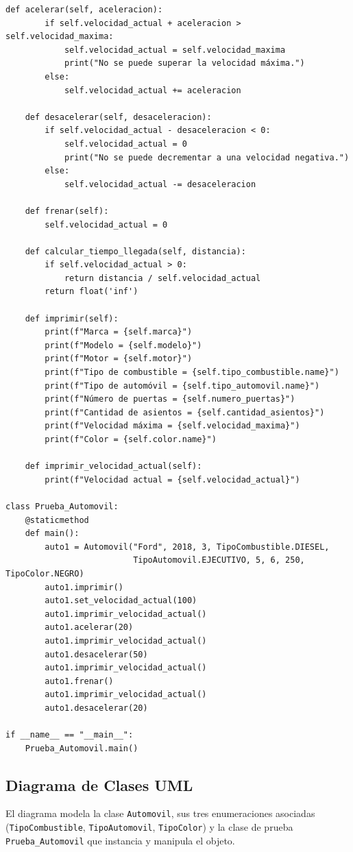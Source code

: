 \documentclass[11pt,a4paper]{article}
\begin{document}
\begin{lstlisting}[caption={Implementación de la clase Automóvil y pruebas (\texttt{Actividad2\_Ejercicio2\_3\_Automovil.py})}]
    def acelerar(self, aceleracion):
        if self.velocidad_actual + aceleracion > self.velocidad_maxima:
            self.velocidad_actual = self.velocidad_maxima
            print("No se puede superar la velocidad máxima.")
        else:
            self.velocidad_actual += aceleracion

    def desacelerar(self, desaceleracion):
        if self.velocidad_actual - desaceleracion < 0:
            self.velocidad_actual = 0
            print("No se puede decrementar a una velocidad negativa.")
        else:
            self.velocidad_actual -= desaceleracion

    def frenar(self):
        self.velocidad_actual = 0

    def calcular_tiempo_llegada(self, distancia):
        if self.velocidad_actual > 0:
            return distancia / self.velocidad_actual
        return float('inf')

    def imprimir(self):
        print(f"Marca = {self.marca}")
        print(f"Modelo = {self.modelo}")
        print(f"Motor = {self.motor}")
        print(f"Tipo de combustible = {self.tipo_combustible.name}")
        print(f"Tipo de automóvil = {self.tipo_automovil.name}")
        print(f"Número de puertas = {self.numero_puertas}")
        print(f"Cantidad de asientos = {self.cantidad_asientos}")
        print(f"Velocidad máxima = {self.velocidad_maxima}")
        print(f"Color = {self.color.name}")

    def imprimir_velocidad_actual(self):
        print(f"Velocidad actual = {self.velocidad_actual}")

class Prueba_Automovil:
    @staticmethod
    def main():
        auto1 = Automovil("Ford", 2018, 3, TipoCombustible.DIESEL,
                          TipoAutomovil.EJECUTIVO, 5, 6, 250, TipoColor.NEGRO)
        auto1.imprimir()
        auto1.set_velocidad_actual(100)
        auto1.imprimir_velocidad_actual()
        auto1.acelerar(20)
        auto1.imprimir_velocidad_actual()
        auto1.desacelerar(50)
        auto1.imprimir_velocidad_actual()
        auto1.frenar()
        auto1.imprimir_velocidad_actual()
        auto1.desacelerar(20)

if __name__ == "__main__":
    Prueba_Automovil.main()
\end{lstlisting}

\subsection{Diagrama de Clases UML}
El diagrama modela la clase \texttt{Automovil}, sus tres enumeraciones asociadas (\texttt{TipoCombustible}, \texttt{TipoAutomovil}, \texttt{TipoColor}) y la clase de prueba \texttt{Prueba\_Automovil} que instancia y manipula el objeto.
\end{document}
